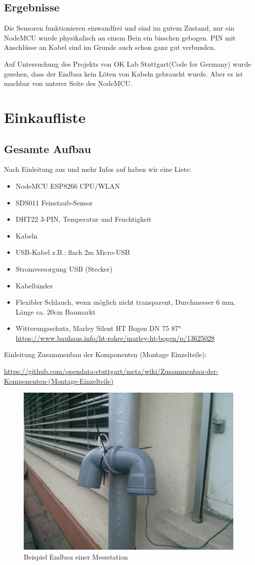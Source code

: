 \documentclass[draft=false
              ,paper=a4
              ,twoside=false
              ,fontsize=10pt
              ,headsepline
              ,BCOR10mm
              ,DIV11
              ]{article}
\begin{document}
\subsection{Ergebnisse}
Die Sensoren funktionieren einwandfrei und sind im gutem Zustand, nur ein NodeMCU wurde physikalisch an einem Bein ein bisschen gebogen. PIN mit Anschlüsse an Kabel sind im Grunde auch schon ganz gut verbunden.

Auf Untersuchung des Projekts von OK Lab Stuttgart(Code for Germany) wurde gesehen, dass der Endbau kein Löten von Kabeln gebraucht wurde. Aber es ist machbar von unterer Seite des NodeMCU.

\section{Einkaufliste}
\subsection{Gesamte Aufbau}
Nach Einleitung aus \cite{airrohrbau} und mehr Infos auf \cite{wiki} haben wir eine Liste:

\begin{itemize}
  \item NodeMCU ESP8266 CPU/WLAN
  \item SDS011 Feinstaub-Sensor
  \item DHT22 3-PIN, Temperatur und Feuchtigkeit
  \item Kabeln
  \item USB-Kabel z.B.: flach 2m Micro-USB
  \item Stromversorgung USB (Stecker)
  \item Kabelbinder
  \item Flexibler Schlauch, wenn möglich nicht transparent, Durchmesser 6 mm, Länge ca. 20cm Baumarkt
  \item Witterungsschutz, Marley Silent HT Bogen DN 75 87° \url{https://www.bauhaus.info/ht-rohre/marley-ht-bogen/p/13625028}
\end{itemize}

Einleitung Zusammenbau der Komponenten (Montage Einzelteile): 

\url{https://github.com/opendata-stuttgart/meta/wiki/Zusammenbau-der-Komponenten-(Montage-Einzelteile)}

\begin{figure}[H]
  \includegraphics[width=0.8\linewidth]{endbau}
  \caption{Beispiel Endbau einer Messstation}
\end{figure}
\end{document}
